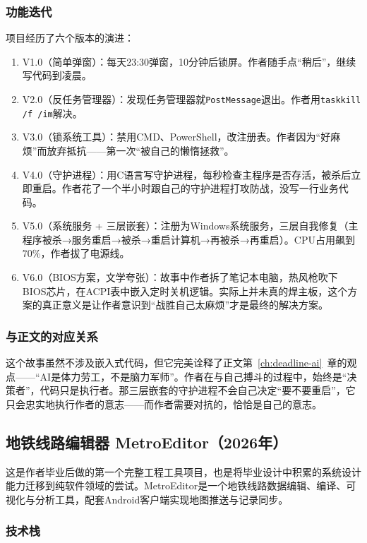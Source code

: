 \subsubsection{功能迭代}

项目经历了六个版本的演进：

\begin{enumerate}
	\item V1.0（简单弹窗）：每天23:30弹窗，10分钟后锁屏。作者随手点“稍后”，继续写代码到凌晨。
	\item V2.0（反任务管理器）：发现任务管理器就\texttt{PostMessage}退出。作者用\texttt{taskkill /f /im}解决。
	\item V3.0（锁系统工具）：禁用CMD、PowerShell，改注册表。作者因为“好麻烦”而放弃抵抗——第一次“被自己的懒惰拯救”。
	\item V4.0（守护进程）：用C语言写守护进程，每秒检查主程序是否存活，被杀后立即重启。作者花了一个半小时跟自己的守护进程打攻防战，没写一行业务代码。
	\item V5.0（系统服务 + 三层嵌套）：注册为Windows系统服务，三层自我修复（主程序被杀→服务重启→被杀→重启计算机→再被杀→再重启）。CPU占用飙到70\%，作者拔了电源线。
	\item V6.0（BIOS方案，文学夸张）：故事中作者拆了笔记本电脑，热风枪吹下BIOS芯片，在ACPI表中嵌入定时关机逻辑。实际上并未真的焊主板，这个方案的真正意义是让作者意识到“战胜自己太麻烦”才是最终的解决方案。
\end{enumerate}

\subsubsection{与正文的对应关系}

这个故事虽然不涉及嵌入式代码，但它完美诠释了正文第~\ref{ch:deadline-ai}~章的观点——“AI是体力劳工，不是脑力军师”。作者在与自己搏斗的过程中，始终是“决策者”，代码只是执行者。那三层嵌套的守护进程不会自己决定“要不要重启”，它只会忠实地执行作者的意志——而作者需要对抗的，恰恰是自己的意志。


\subsection{地铁线路编辑器 MetroEditor（2026年）}

这是作者毕业后做的第一个完整工程工具项目，也是将毕业设计中积累的系统设计能力迁移到纯软件领域的尝试。MetroEditor是一个地铁线路数据编辑、编译、可视化与分析工具，配套Android客户端实现地图推送与记录同步。

\subsubsection{技术栈}

